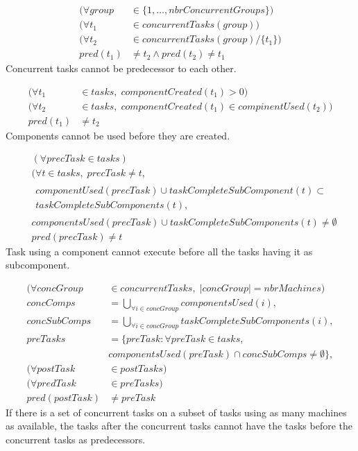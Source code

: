 \documentclass[10pt,a4paper]{report}
\begin{document}
\begin{equation}
\begin{aligned}\label{eq:88}
(\forall group &\in \{1 , \ldots , nbrConcurrentGroups\}) \\
(\forall t_1 &\in concurrentTasks(group)) \\
(\forall t_2 &\in concurrentTasks(group) / \{t_1\}) \\
pred(t_1) &\neq t_2 \land pred(t_2) \neq t_1
\end{aligned}
\end{equation}
Concurrent tasks cannot be predecessor to each other.

\begin{equation}
\begin{aligned}\label{eq:89}
(\forall t_1 &\in tasks, \; componentCreated(t_1) > 0) \\
(\forall t_2 &\in tasks, \; componentCreated(t_1) \in compinentUsed(t_2)) \\
pred(t_1) &\neq t_2
\end{aligned}
\end{equation}
Components cannot be used before they are created.

\begin{equation}
\begin{aligned}\label{eq:90}
&(\forall precTask \in tasks) \\
&(\forall t \in tasks, \; precTask \neq t,\\
&\begin{aligned}componentUsed(precTask) \cup taskCompleteSubComponent(t) \subset\\
taskCompleteSubComponents(t), \end{aligned}\\
&componentsUsed(precTask) \cup taskCompleteSubComponents(t) \neq \emptyset \\
&pred(precTask) \neq t
\end{aligned}
\end{equation}
Task using a component cannot execute before all the tasks having it as subcomponent.

\begin{equation}
\begin{aligned}\label{eq:91}
(\forall concGroup &\in concurrentTasks, \; |concGroup| = nbrMachines) \\
concComps &= \bigcup_{\forall i \in concGroup}componentsUsed(i), \\
concSubComps &= \bigcup_{\forall i \in concGroup}taskCompleteSubComponents(i), \\
preTasks &= \{preTask : \forall preTask \in tasks,\\
&componentsUsed(preTask) \cap concSubComps \neq \emptyset\}, \\
(\forall postTask &\in postTasks) \\
(\forall predTask &\in preTasks) \\
pred(postTask) &\neq preTask
\end{aligned}
\end{equation}
If there is a set of concurrent tasks on a subset of tasks using as many machines as available, the tasks after the concurrent tasks cannot have the tasks before the concurrent tasks as predecessors.
\end{document}
